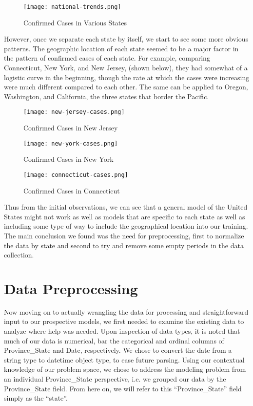\documentclass[sigconf,nonacm]{acmart}
\begin{document}
\begin{figure}
  \centering
  \texttt{[image: national-trends.png]}
  \caption{Confirmed Cases in Various States}
\end{figure}

However, once we separate each state by itself, we start to see some more
obvious patterns. The geographic location of each state seemed to be a major
factor in the pattern of confirmed cases of each state. For example, comparing
Connecticut, New York, and New Jersey, (shown below), they had somewhat of a
logistic curve in the beginning, though the rate at which the cases were
increasing were much different compared to each other. The same can be applied
to Oregon, Washington, and California, the three states that border the
Pacific. 

\begin{figure}
  \centering
  \texttt{[image: new-jersey-cases.png]}
  \caption{Confirmed Cases in New Jersey}
\end{figure}

\begin{figure}
  \texttt{[image: new-york-cases.png]}
  \caption{Confirmed Cases in New York}
\end{figure}

\begin{figure}
  \texttt{[image: connecticut-cases.png]}
  \caption{Confirmed Cases in Connecticut}
\end{figure}

Thus from the initial observations, we can see that a general model of the
United States might not work as well as models that are specific to each state
as well as including some type of way to include the geographical location into
our training. The main conclusion we found was the need for preprocessing,
first to normalize the data by state and second to try and remove some empty
periods in the data collection.

\section{Data Preprocessing}

Now moving on to actually wrangling the data for processing and straightforward
input to our prospective models, we first needed to examine the existing data
to analyze where help was needed. Upon inspection of data types, it is noted
that much of our data is numerical, bar the categorical and ordinal columns of
Province\_State and Date, respectively. We chose to convert the date from a
string type to datetime object type, to ease future parsing. Using our
contextual knowledge of our problem space, we chose to address the modeling
problem from an individual Province\_State perspective, i.e. we grouped our
data by the Province\_State field. From here on, we will refer to this
“Province\_State” field simply as the “state”. 
\end{document}
